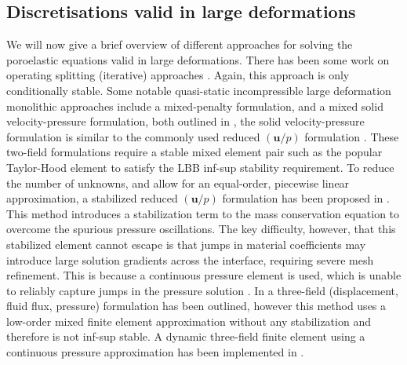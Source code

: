 \subsection{Discretisations valid in large deformations}


We will now give a brief overview of different approaches for solving the poroelastic equations valid in large deformations. There has been some work on operating splitting (iterative) approaches \citep{chapelle2010poroelastic}. Again, this approach is only conditionally stable. Some notable quasi-static incompressible large deformation monolithic approaches include a mixed-penalty formulation, and a mixed solid velocity-pressure formulation, both outlined in \citep{almeida1998finite}, the solid velocity-pressure formulation is similar to the commonly used reduced $(\boldsymbol{u}/p)$ formulation \citep{ateshian2010finite}. These two-field formulations require a stable mixed element pair such as the popular Taylor-Hood element to satisfy the LBB inf-sup stability requirement. To reduce the number of unknowns, and allow for an equal-order, piecewise linear approximation, a stabilized reduced $(\boldsymbol{u}/p)$ formulation has been proposed in \citep{white2008stabilized}. This method introduces a stabilization term to the mass conservation equation to overcome the spurious pressure oscillations. The key difficulty, however, that this stabilized element cannot escape is that jumps in material coefficients may introduce large solution gradients across the
interface, requiring severe mesh refinement. This is because a continuous pressure element is used, which is unable to reliably capture jumps in the pressure solution \citep{white2008stabilized}. In \citep{levenston1998variationally} a three-field (displacement, fluid flux, pressure) formulation has been outlined, however this method uses a low-order mixed finite element approximation without any stabilization and therefore is not inf-sup stable. A dynamic three-field finite element using a continuous pressure approximation has been implemented in \cite{vuong2014general}.






 